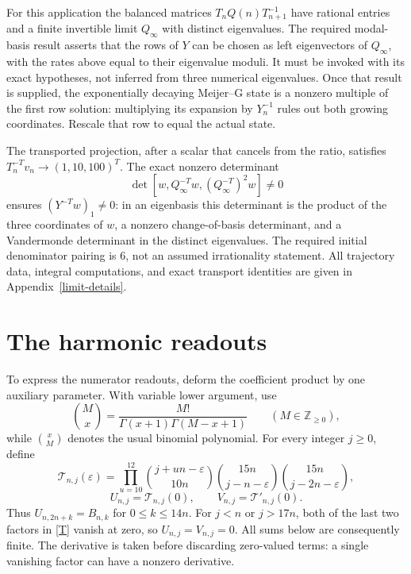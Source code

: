 \documentclass[11pt]{article}
\newcommand{\Z}{\mathbb Z}
\begin{document}
For this application the balanced matrices
$T_nQ(n)T_{n+1}^{-1}$ have rational entries and a finite invertible
limit $Q_\infty$ with distinct eigenvalues. The required modal-basis
result asserts that the rows of $Y$ can be chosen as left eigenvectors
of $Q_\infty$, with the rates above equal to their eigenvalue moduli.
It must be invoked with its exact hypotheses, not inferred from three
numerical eigenvalues. Once that result is supplied, the exponentially
decaying Meijer--G state is a nonzero multiple of the first row solution:
multiplying its expansion by $Y_n^{-1}$ rules out both growing
coordinates. Rescale that row to equal the actual state.

The transported projection, after a scalar that cancels from the ratio,
satisfies $T_n^{-T}v_n\to(1,10,100)^T$. The exact nonzero determinant
\[
 \det[w,Q_\infty^{-T}w,(Q_\infty^{-T})^2w]\ne0
\]
ensures $(Y^{-T}w)_1\ne0$: in an eigenbasis this determinant is the
product of the three coordinates of $w$, a nonzero change-of-basis
determinant, and a Vandermonde determinant in the distinct eigenvalues.
The required initial denominator pairing is $6$, not an assumed
irrationality statement. All trajectory data, integral computations,
and exact transport identities are given in Appendix~\ref{limit-details}.

\section{The harmonic readouts}
To express the numerator readouts, deform the coefficient product by
one auxiliary parameter. With variable lower argument, use
\[
 \binom{M}{x}=\frac{M!}{\Gamma(x+1)\Gamma(M-x+1)}\qquad(M\in\Z_{\geq0}),
\]
while $\binom{x}{M}$ denotes the usual binomial polynomial.
For every integer $j\geq0$, define
\begin{equation}\label{T}
 \mathcal T_{n,j}(\varepsilon)=
 \prod_{u=10}^{12}\binom{j+un-\varepsilon}{10n}
 \binom{15n}{j-n-\varepsilon}
 \binom{15n}{j-2n-\varepsilon},
\end{equation}
\[
 U_{n,j}=\mathcal T_{n,j}(0),\qquad
 V_{n,j}=\mathcal T'_{n,j}(0).
\]
Thus $U_{n,2n+k}=B_{n,k}$ for $0\leq k\leq14n$.
For $j<n$ or $j>17n$, both of the last two factors in \eqref{T}
vanish at zero, so $U_{n,j}=V_{n,j}=0$. All sums below are consequently
finite. The derivative is taken before discarding zero-valued terms:
a single vanishing factor can have a nonzero derivative.
\end{document}
